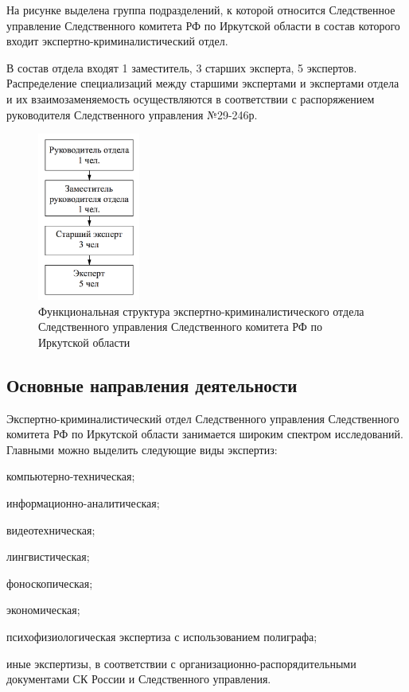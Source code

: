 На рисунке выделена группа подразделений, к которой относится Следственное управление Следственного комитета РФ по Иркутской области в состав которого входит экспертно-криминалистический отдел.

В состав отдела входят 1 заместитель, 3 старших эксперта, 5 экспертов. Распределение специализаций между старшими экспертами и экспертами отдела и их взаимозаменяемость осуществляются в соответствии с распоряжением руководителя Следственного управления №29-246р.\cite{29-246}

\begin{figure}[H]
	\centering
	\includegraphics[width=0.3\textwidth]{pics/func_struct.png}
	\caption{Функциональная структура экспертно-криминалистического отдела Следственного управления Следственного комитета РФ по Иркутской области}
\end{figure}

\subsection{Основные направления деятельности}

Экспертно-криминалистический отдел Следственного управления Следственного комитета РФ по Иркутской области занимается широким спектром исследований. Главными можно выделить следующие виды экспертиз:

\begin{enumerate*}
	\item компьютерно-техническая;
	\item информационно-аналитическая;
	\item видеотехническая;
	\item лингвистическая;
	\item фоноскопическая;
	\item экономическая;
	\item психофизиологическая экспертиза с использованием полиграфа;
	\item иные экспертизы, в соответствии с организационно-распорядительными документами СК России и Следственного управления.
\end{enumerate*}

